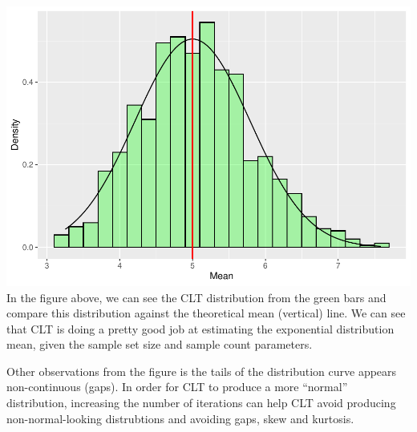 \documentclass[]{article}
\begin{document}
\includegraphics{StatsInf-Part1_files/figure-latex/unnamed-chunk-4-1.pdf}
In the figure above, we can see the CLT distribution from the green bars
and compare this distribution against the theoretical mean (vertical)
line. We can see that CLT is doing a pretty good job at estimating the
exponential distribution mean, given the sample set size and sample
count parameters.

Other observations from the figure is the tails of the distribution
curve appears non-continuous (gaps). In order for CLT to produce a more
``normal'' distribution, increasing the number of iterations can help
CLT avoid producing non-normal-looking distrubtions and avoiding gaps,
skew and kurtosis.
\end{document}

